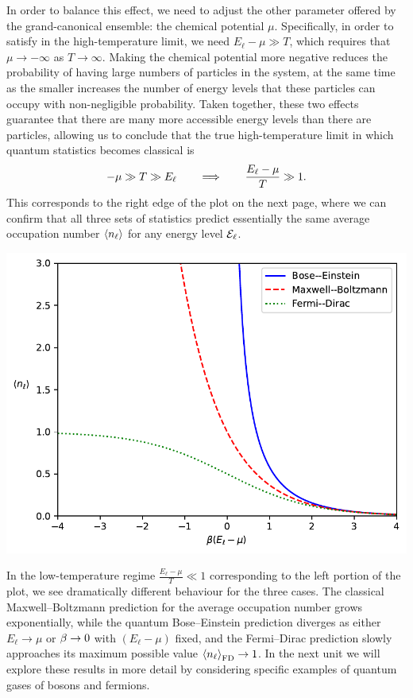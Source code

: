 In order to balance this effect, we need to adjust the other parameter offered by the grand-canonical ensemble: the chemical potential $\mu$.
Specifically, in order to satisfy  in the high-temperature limit, we need $E_{\ell} - \mu \gg T$, which requires that $\mu \to -\infty$ as $T \to \infty$.
Making the chemical potential more negative reduces the probability of having large numbers of particles in the system, at the same time as the smaller \be increases the number of energy levels that these particles can occupy with non-negligible probability.
Taken together, these two effects guarantee that there are many more accessible energy levels than there are particles, allowing us to conclude that the true high-temperature limit in which quantum statistics becomes classical is
\begin{equation}
  -\mu \gg T \gg E_{\ell} \qquad \Longrightarrow \qquad \frac{E_{\ell} - \mu}{T} \gg 1.
\end{equation}
This corresponds to the right edge of the plot on the next page, where we can confirm that all three sets of statistics predict essentially the same average occupation number $\left\langle n_{\ell} \right\rangle$ for any energy level $\mathcal E_{\ell}$.

\begin{center}\includegraphics[width=\textwidth]{figs/unit07_dist.pdf}\end{center}

In the low-temperature regime $\frac{E_{\ell} - \mu}{T} \ll 1$ corresponding to the left portion of the plot, we see dramatically different behaviour for the three cases.
The classical Maxwell--Boltzmann prediction for the average occupation number grows exponentially, while the quantum Bose--Einstein prediction diverges as either $E_{\ell} \to \mu$ or $\beta \to 0$ with $(E_{\ell} - \mu)$ fixed, and the Fermi--Dirac prediction slowly approaches its maximum possible value $\left\langle n_{\ell} \right\rangle_{\text{FD}} \to 1$.
In the next unit we will explore these results in more detail by considering specific examples of quantum gases of bosons and fermions.
